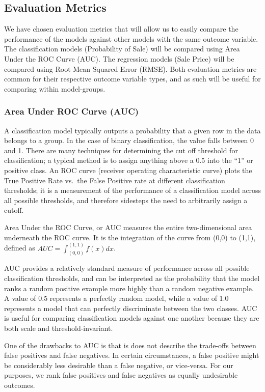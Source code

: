 \documentclass[]{article}
\begin{document}
\subsection{Evaluation Metrics}\label{evaluation-metrics}

We have chosen evaluation metrics that will allow us to easily compare
the performance of the models against other models with the same outcome
variable. The classification models (Probability of Sale) will be
compared using Area Under the ROC Curve (AUC). The regression models
(Sale Price) will be compared using Root Mean Squared Error (RMSE). Both
evaluation metrics are common for their respective outcome variable
types, and as such will be useful for comparing within model-groups.

\subsubsection{Area Under ROC Curve
(AUC)}\label{area-under-roc-curve-auc}

A classification model typically outputs a probability that a given row
in the data belongs to a group. In the case of binary classification,
the value falls between 0 and 1. There are many techniques for
determining the cut off threshold for classification; a typical method
is to assign anything above a 0.5 into the ``1'' or positive class. An
ROC curve (receiver operating characteristic curve) plots the True
Positive Rate vs.~the False Positive rate at different classification
thresholds; it is a measurement of the performance of a classification
model across all possible thresholds, and therefore sidesteps the need
to arbitrarily assign a cutoff.

Area Under the ROC Curve, or AUC measures the entire two-dimensional
area underneath the ROC curve. It is the integration of the curve from
(0,0) to (1,1), defined as \(AUC = \int_{(0,0)}^{(1,1)} f(x)dx\).

AUC provides a relatively standard measure of performance across all
possible classification thresholds, and can be interpreted as the
probability that the model ranks a random positive example more highly
than a random negative example. A value of 0.5 represents a perfectly
random model, while a value of 1.0 represents a model that can perfectly
discriminate between the two classes. AUC is useful for comparing
classification models against one another because they are both scale
and threshold-invariant.

One of the drawbacks to AUC is that is does not describe the trade-offs
between false positives and false negatives. In certain circumstances, a
false positive might be considerably less desirable than a false
negative, or vice-versa. For our purposes, we rank false positives and
false negatives as equally undesirable outcomes.
\end{document}
